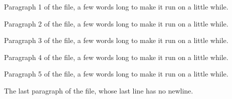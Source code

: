 Paragraph 1 of the file, a few words long to make it run on a little while.

Paragraph 2 of the file, a few words long to make it run on a little while.

Paragraph 3 of the file, a few words long to make it run on a little while.

Paragraph 4 of the file, a few words long to make it run on a little while.

Paragraph 5 of the file, a few words long to make it run on a little while.

The last paragraph of the file, whose last line has no newline.
